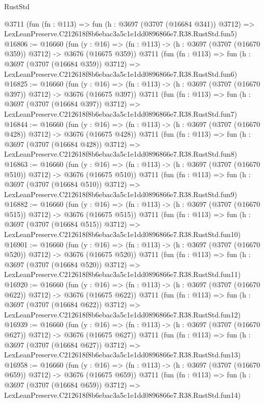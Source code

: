 \begin{lexlean}{RustStd}
\begin{coremodule}
    @3711
    (fun (fn : @113) =>
    fun (h : @3697 (@3707 (@16684 @341)) @3712) =>
    LexLeanPreserve.C212618f8b6ebac3a5c1e1dd0896866e7.R38.RustStd.fun5)
@16806 := @16660
    (fun (y : @16) => (fn : @113) -> (h : @3697 (@3707 (@16670 @359)) @3712) -> @3676 (@16675 @359))
    @3711
    (fun (fn : @113) =>
    fun (h : @3697 (@3707 (@16684 @359)) @3712) =>
    LexLeanPreserve.C212618f8b6ebac3a5c1e1dd0896866e7.R38.RustStd.fun6)
@16825 := @16660
    (fun (y : @16) => (fn : @113) -> (h : @3697 (@3707 (@16670 @397)) @3712) -> @3676 (@16675 @397))
    @3711
    (fun (fn : @113) =>
    fun (h : @3697 (@3707 (@16684 @397)) @3712) =>
    LexLeanPreserve.C212618f8b6ebac3a5c1e1dd0896866e7.R38.RustStd.fun7)
@16844 := @16660
    (fun (y : @16) => (fn : @113) -> (h : @3697 (@3707 (@16670 @428)) @3712) -> @3676 (@16675 @428))
    @3711
    (fun (fn : @113) =>
    fun (h : @3697 (@3707 (@16684 @428)) @3712) =>
    LexLeanPreserve.C212618f8b6ebac3a5c1e1dd0896866e7.R38.RustStd.fun8)
@16863 := @16660
    (fun (y : @16) => (fn : @113) -> (h : @3697 (@3707 (@16670 @510)) @3712) -> @3676 (@16675 @510))
    @3711
    (fun (fn : @113) =>
    fun (h : @3697 (@3707 (@16684 @510)) @3712) =>
    LexLeanPreserve.C212618f8b6ebac3a5c1e1dd0896866e7.R38.RustStd.fun9)
@16882 := @16660
    (fun (y : @16) => (fn : @113) -> (h : @3697 (@3707 (@16670 @515)) @3712) -> @3676 (@16675 @515))
    @3711
    (fun (fn : @113) =>
    fun (h : @3697 (@3707 (@16684 @515)) @3712) =>
    LexLeanPreserve.C212618f8b6ebac3a5c1e1dd0896866e7.R38.RustStd.fun10)
@16901 := @16660
    (fun (y : @16) => (fn : @113) -> (h : @3697 (@3707 (@16670 @520)) @3712) -> @3676 (@16675 @520))
    @3711
    (fun (fn : @113) =>
    fun (h : @3697 (@3707 (@16684 @520)) @3712) =>
    LexLeanPreserve.C212618f8b6ebac3a5c1e1dd0896866e7.R38.RustStd.fun11)
@16920 := @16660
    (fun (y : @16) => (fn : @113) -> (h : @3697 (@3707 (@16670 @622)) @3712) -> @3676 (@16675 @622))
    @3711
    (fun (fn : @113) =>
    fun (h : @3697 (@3707 (@16684 @622)) @3712) =>
    LexLeanPreserve.C212618f8b6ebac3a5c1e1dd0896866e7.R38.RustStd.fun12)
@16939 := @16660
    (fun (y : @16) => (fn : @113) -> (h : @3697 (@3707 (@16670 @627)) @3712) -> @3676 (@16675 @627))
    @3711
    (fun (fn : @113) =>
    fun (h : @3697 (@3707 (@16684 @627)) @3712) =>
    LexLeanPreserve.C212618f8b6ebac3a5c1e1dd0896866e7.R38.RustStd.fun13)
@16958 := @16660
    (fun (y : @16) => (fn : @113) -> (h : @3697 (@3707 (@16670 @659)) @3712) -> @3676 (@16675 @659))
    @3711
    (fun (fn : @113) =>
    fun (h : @3697 (@3707 (@16684 @659)) @3712) =>
    LexLeanPreserve.C212618f8b6ebac3a5c1e1dd0896866e7.R38.RustStd.fun14)

\end{coremodule}
\end{lexlean}
